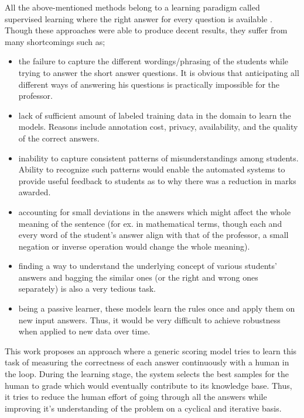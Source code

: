 \documentclass[rnd]{mas_proposal}
\begin{document}
All the above-mentioned methods belong to a learning paradigm called supervised learning where the right answer for every question is available \cite{Horbach2016}. Though these approaches were able to produce decent results, they suffer from many shortcomings such as;

\begin{itemize}

\item the failure to capture the different wordings/phrasing of the students while trying to answer the short answer questions. It is obvious that anticipating all different ways of answering his questions is practically impossible for the professor. 

\item lack of sufficient amount of labeled training data in the domain to learn the models. Reasons include annotation cost, privacy, availability, and the quality of the correct answers. 

\item inability to capture consistent patterns of misunderstandings among students. Ability to recognize such patterns would enable the automated systems to provide useful feedback to students as to why there was a reduction in marks awarded.

\item accounting for small deviations in the answers which might affect the whole meaning of the sentence (for ex. in mathematical terms, though each and every word of the student's answer align with that of the professor, a small negation or inverse operation would change the whole meaning).

\item finding a way to understand the underlying concept of various students' answers and bagging the similar ones (or the right and wrong ones separately) is also a very tedious task. 

\item being a passive learner, these models learn the rules once and apply them on new input answers. Thus, it would be very difficult to achieve robustness when applied to new data over time. \\

\end{itemize}

This work proposes an approach where a generic scoring model tries to learn this task of measuring the correctness of each answer continuously with a human in the loop. During the learning stage, the system selects the best samples for the human to grade which would eventually contribute to its knowledge base. Thus, it tries to reduce the human effort of going through all the answers while improving it's understanding of the problem on a cyclical and iterative basis. \\
\end{document}
